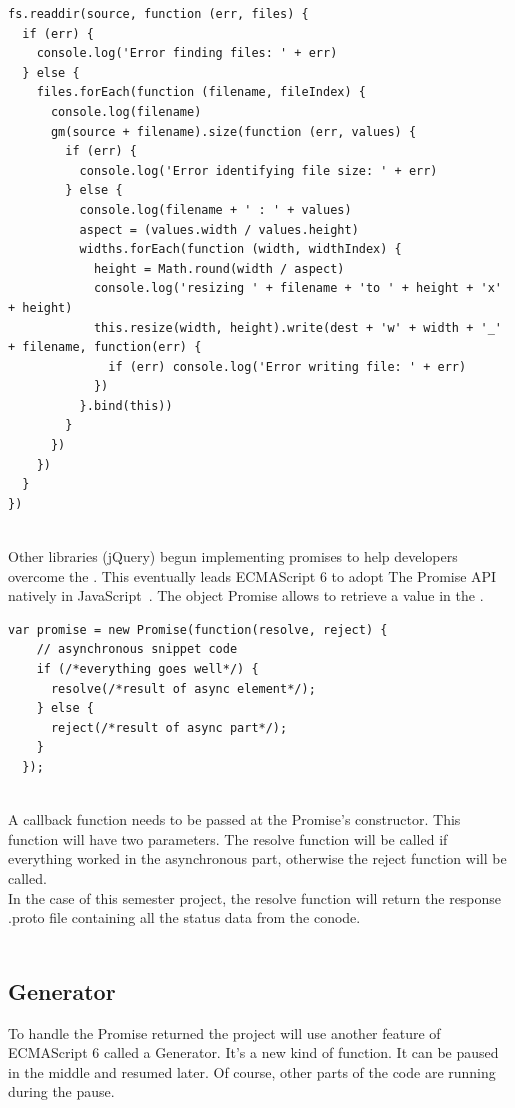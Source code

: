 \documentclass[11pt, a4paper, twoside, openright]{book} %
\begin{document}
\begin{lstlisting}[caption={Example of Callback Hell with its typical pyramid shape}, captionpos=b]
  fs.readdir(source, function (err, files) {
  if (err) {
    console.log('Error finding files: ' + err)
  } else {
    files.forEach(function (filename, fileIndex) {
      console.log(filename)
      gm(source + filename).size(function (err, values) {
        if (err) {
          console.log('Error identifying file size: ' + err)
        } else {
          console.log(filename + ' : ' + values)
          aspect = (values.width / values.height)
          widths.forEach(function (width, widthIndex) {
            height = Math.round(width / aspect)
            console.log('resizing ' + filename + 'to ' + height + 'x' + height)
            this.resize(width, height).write(dest + 'w' + width + '_' + filename, function(err) {
              if (err) console.log('Error writing file: ' + err)
            })
          }.bind(this))
        }
      })
    })
  }
})
\end{lstlisting}
\leavevmode \\
Other libraries (jQuery) begun implementing promises to help developers overcome the .
This eventually leads ECMAScript 6 to adopt The Promise API~\cite{promise} natively in JavaScript~\cite{ecmaPromise}.
The object Promise allows to retrieve a value in the .
\\
\begin{lstlisting}[caption={Structure of a Promise}, captionpos=b]
  var promise = new Promise(function(resolve, reject) {
    // asynchronous snippet code
    if (/*everything goes well*/) {
      resolve(/*result of async element*/);
    } else {
      reject(/*result of async part*/);
    }
  });
\end{lstlisting}
\leavevmode \\
A callback function needs to be passed at the Promise's constructor. This function
will have two parameters. The resolve function will be called if everything worked in
the asynchronous part, otherwise the reject function will be called.\\
In the case of this semester project, the resolve function will return the response
.proto file containing all the status data from the conode.\\

\leavevmode \\

\subsection{Generator}
To handle the Promise returned the project will use another feature of ECMAScript 6 called a Generator.
It's a new kind of function. It can be paused in the middle and resumed later. Of course,
other parts of the code are running during the pause.\\
\end{document}
